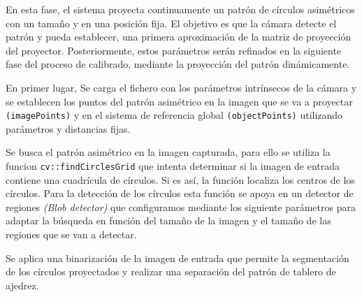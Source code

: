 En esta fase, el sistema proyecta continuamente un patrón de círculos asimétricos con un tamaño y en una posición fija. El objetivo es que la cámara detecte el patrón y pueda establecer, una primera aproximación de la matriz de proyección del proyector. Posteriormente, estos parámetros serán refinados en la siguiente fase del proceso de calibrado, mediante la proyección del patrón dinámicamente.

En primer lugar, Se carga el fichero con los parámetros intrínsecos de la cámara y se establecen los puntos del patrón asimétrico en la imagen que se va a proyectar \texttt{(imagePoints)} y en el sistema de referencia global \texttt{(objectPoints)} utilizando parámetros y distancias fijas.  


Se busca el patrón asimétrico en la imagen capturada, para ello se utiliza la funcion \texttt{cv::findCirclesGrid} que intenta determinar si la imagen de entrada contiene una cuadrícula de círculos. Si es así, la función localiza los centros de los círculos. Para la detección de los círculos esta función se apoya en un detector de regiones \emph{(Blob detector)} que configuramos mediante los siguiente parámetros para adaptar la búsqueda en función del tamaño de la imagen y el tamaño de las regiones que se van a detectar.


Se aplica una binarización de la imagen de entrada que permite la segmentación de los círculos proyectados y realizar una separación del patrón de tablero de ajedrez.

